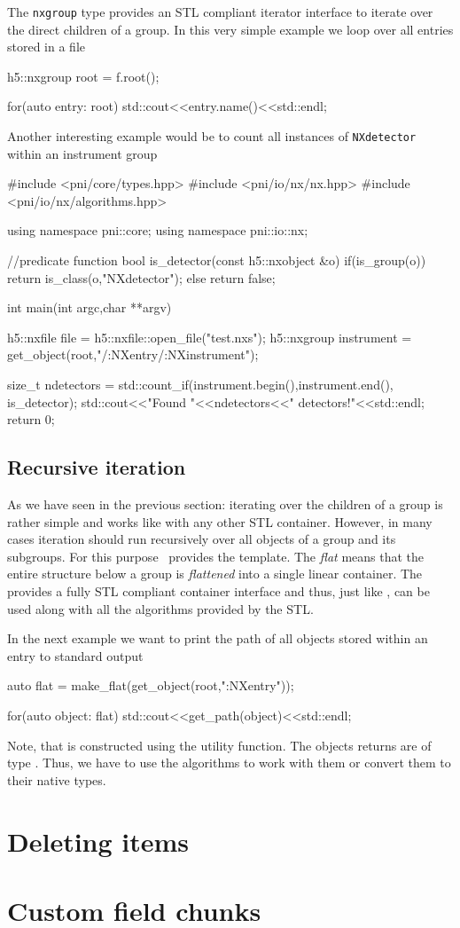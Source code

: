 The {\tt nxgroup} type provides an STL compliant iterator interface to iterate
over the direct children of a group. In this very simple example we loop over 
all entries stored in a file
\begin{cppcode}
h5::nxgroup root = f.root();

for(auto entry: root)
    std::cout<<entry.name()<<std::endl;
\end{cppcode}
Another interesting example would be to count all instances of {\tt NXdetector} 
within an instrument group
\begin{cppcode}
#include <pni/core/types.hpp>
#include <pni/io/nx/nx.hpp>
#include <pni/io/nx/algorithms.hpp>

using namespace pni::core;
using namespace pni::io::nx;

//predicate function
bool is_detector(const h5::nxobject &o)
{
    if(is_group(o)) return is_class(o,"NXdetector");
    else return false;
}

int main(int argc,char **argv)
{
    h5::nxfile file = h5::nxfile::open_file("test.nxs");
    h5::nxgroup instrument = get_object(root,"/:NXentry/:NXinstrument");

    size_t ndetectors = std::count_if(instrument.begin(),instrument.end(),
                                      is_detector);
    std::cout<<"Found "<<ndetectors<<" detectors!"<<std::endl;
    return 0;
}
\end{cppcode}

\subsection{Recursive iteration}
As we have seen in the previous section: iterating over the children of a group
is rather simple and works like with any other STL container. However, in many
cases iteration should run recursively over all objects of a group and its
subgroups. For this purpose \libpniio\ provides the  template. 
The \emph{flat} means that the entire structure below a group is
\emph{flattened} into a single linear container. The  provides 
a fully STL compliant container interface and thus, just like \nxgroup, can be
used along with all the algorithms provided by the STL. 

In the next example we want to print the path of all objects stored within an
entry to standard output
\begin{cppcode}
auto flat = make_flat(get_object(root,":NXentry"));

for(auto object: flat)
    std::cout<<get_path(object)<<std::endl;
\end{cppcode}
Note, that  is constructed using the  utility
function. The objects  returns are of type \nxobject. Thus, we
have to use the algorithms to work with them or convert them to their native
types.

\section{Deleting items}



\section{Custom field chunks}\label{section:field_chunks}



